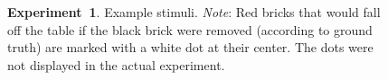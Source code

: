 \documentclass[10pt, letterpaper]{article}
\begin{document}
\begin{figure}[t]
{\hfill}
\hfill
{}
\hfill
{}
\hfill
{}
{\hfill}
\vspace{-0.6cm}
\caption{\textbf{Experiment~1}. Example stimuli. \emph{Note}: Red bricks that would fall off the table if the black brick were removed (according to ground truth) are marked with a white dot at their center. The dots were not displayed in the actual experiment.}
\label{fig:exp1_stimuli}
\end{figure}
\end{document}
